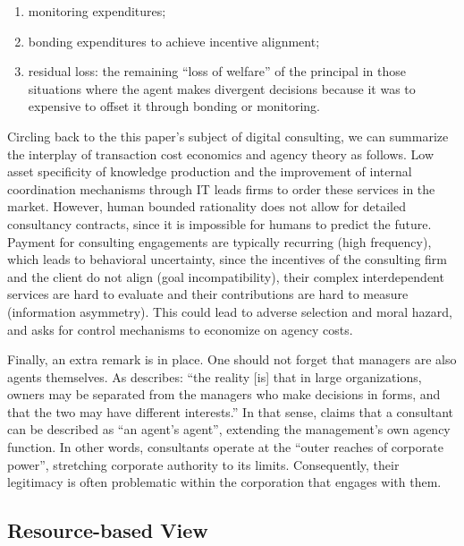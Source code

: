 \documentclass[12pt]{article}
\providecommand{\tightlist}{%
  \setlength{\itemsep}{0pt}\setlength{\parskip}{0pt}}
\begin{document}
\begin{enumerate}
\def\labelenumi{\arabic{enumi}.}
\tightlist
\item
  monitoring expenditures;
\item
  bonding expenditures to achieve incentive alignment;
\item
  residual loss: the remaining ``loss of welfare'' of the principal in
  those situations where the agent makes divergent decisions because it
  was to expensive to offset it through bonding or monitoring.
\end{enumerate}

Circling back to the this paper's subject of digital consulting, we can
summarize the interplay of transaction cost economics and agency theory
as follows. Low asset specificity of knowledge production and the
improvement of internal coordination mechanisms through IT leads firms
to order these services in the market. However, human bounded
rationality does not allow for detailed consultancy contracts, since it
is impossible for humans to predict the future. Payment for consulting
engagements are typically recurring (high frequency), which leads to
behavioral uncertainty, since the incentives of the consulting firm and
the client do not align (goal incompatibility), their complex
interdependent services are hard to evaluate and their contributions are
hard to measure (information asymmetry). This could lead to adverse
selection and moral hazard, and asks for control mechanisms to economize
on agency costs.

Finally, an extra remark is in place. One should not forget that
managers are also agents themselves. As \citet[584]{tosi1997} describes:
``the reality {[}is{]} that in large organizations, owners may be
separated from the managers who make decisions in forms, and that the
two may have different interests.'' In that sense, \citet{fincham2002}
claims that a consultant can be described as ``an agent's agent'',
extending the management's own agency function. In other words,
consultants operate at the ``outer reaches of corporate power'',
stretching corporate authority to its limits. Consequently, their
legitimacy is often problematic within the corporation that engages with
them.

\subsection{Resource-based View}\label{resource-based-view}
\end{document}
